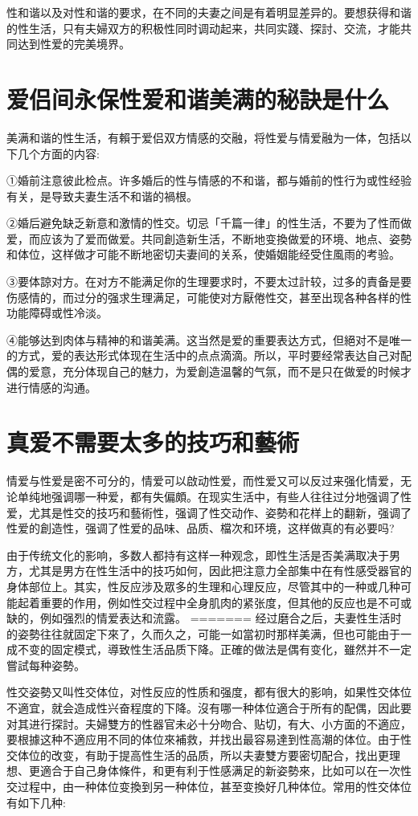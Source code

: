 \documentclass[12pt,UTF8]{ctexbook}
\begin{document}
性和谐以及对性和谐的要求，在不同的夫妻之间是有着明显差异的。要想获得和谐的性生活，只有夫婦双方的积极性同时调动起来，共同实踐、探討、交流，才能共同达到性爱的完美境界。

\section{爱侣间永保性爱和谐美满的秘訣是什么}

美满和谐的性生活，有賴于爱侣双方情感的交融，将性爱与情爱融为一体，包括以下几个方面的内容:

①婚前注意彼此检点。许多婚后的性与情感的不和谐，都与婚前的性行为或性经验有关，是导致夫妻生活不和谐的禍根。

②婚后避免缺乏新意和激情的性交。切忌「千篇一律」的性生活，不要为了性而做爱，而应该为了爱而做爱。共同創造新生活，不断地变換做爱的环境、地点、姿勢和体位，这样做才可能不断地密切夫妻间的关系，使婚姻能经受住風雨的考验。

③要体諒对方。在对方不能满足你的生理要求时，不要太过計较，过多的責备是要伤感情的，而过分的强求生理满足，可能使对方厭倦性交，甚至出现各种各样的性功能障碍或性冷淡。

④能够达到肉体与精神的和谐美满。这当然是爱的重要表达方式，但絕对不是唯一的方式，爱的表达形式体现在生活中的点点滴滴。所以，平时要经常表达自己对配偶的爱意，充分体现自己的魅力，为爱創造温馨的气氛，而不是只在做爱的时候才进行情感的沟通。

\section{真爱不需要太多的技巧和藝術}

情爱与性爱是密不可分的，情爱可以啟动性爱，而性爱又可以反过来强化情爱，无论单纯地强调哪一种爱，都有失偏頗。在现实生活中，有些人往往过分地强调了性爱，尤其是性交的技巧和藝術性，强调了性交动作、姿勢和花样上的翻新，强调了性爱的創造性，强调了性爱的品味、品质、檔次和环境，这样做真的有必要吗?

由于传统文化的影响，多数人都持有这样一种观念，即性生活是否美满取决于男方，尤其是男方在性生活中的技巧如何，因此把注意力全部集中在有性感受器官的身体部位上。其实，性反应涉及眾多的生理和心理反应，尽管其中的一种或几种可能起着重要的作用，例如性交过程中全身肌肉的紧张度，但其他的反应也是不可或缺的，例如强烈的情爱表达和流露。
=======
经过磨合之后，夫妻性生活时的姿勢往往就固定下來了，久而久之，可能一如當初时那样美满，但也可能由于一成不变的固定模式，導致性生活品质下降。正確的做法是偶有变化，雖然并不一定嘗試每种姿勢。

性交姿勢又叫性交体位，对性反应的性质和强度，都有很大的影响，如果性交体位不適宜，就会造成性兴奋程度的下降。沒有哪一种体位適合于所有的配偶，因此要对其进行探討。夫婦雙方的性器官未必十分吻合、贴切，有大、小方面的不適应，要根據这种不適应用不同的体位來補救，并找出最容易達到性高潮的体位。由于性交体位的改变，有助于提高性生活的品质，所以夫妻雙方要密切配合，找出更理想、更適合于自己身体條件，和更有利于性感满足的新姿勢來，比如可以在一次性交过程中，由一种体位变換到另一种体位，甚至变換好几种体位。常用的性交体位有如下几种:
\end{document}
